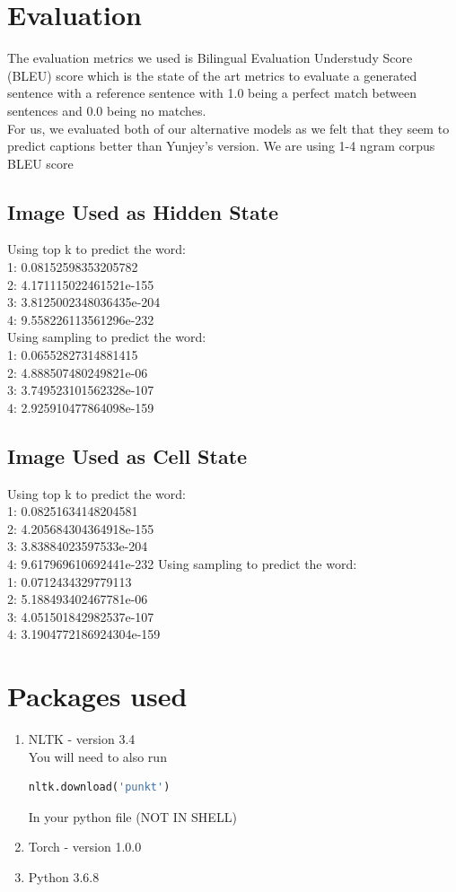 \documentclass{proc}
\begin{document}
\section{Evaluation}
The evaluation metrics we used is Bilingual Evaluation Understudy Score (BLEU) score which is the state of the art metrics to evaluate a generated sentence with a reference sentence with 1.0 being a perfect match between sentences and 0.0 being no matches.\\
For us, we evaluated both of our alternative models as we felt that they seem to predict captions better than Yunjey's version. We are using 1-4 ngram corpus BLEU score\\
\subsection{Image Used as Hidden State}
Using top k to predict the word:\\
1: 0.08152598353205782\\
2: 4.171115022461521e-155\\
3: 3.8125002348036435e-204\\
4: 9.558226113561296e-232\\
Using sampling to predict the word:\\
1: 0.06552827314881415\\
2: 4.888507480249821e-06\\
3: 3.749523101562328e-107\\
4: 2.925910477864098e-159
\subsection{Image Used as Cell State}
Using top k to predict the word:\\
1: 0.08251634148204581\\
2: 4.205684304364918e-155\\
3: 3.83884023597533e-204\\
4: 9.617969610692441e-232
Using sampling to predict the word:\\
1: 0.0712434329779113\\
2: 5.188493402467781e-06\\
3: 4.051501842982537e-107\\
4: 3.1904772186924304e-159

\section{Packages used}
\begin{enumerate}
\item NLTK - version 3.4 \\
You will need to also run 
\begin{lstlisting}[language=python]
nltk.download('punkt')
\end{lstlisting}
In your python file (NOT IN SHELL)
\item Torch - version 1.0.0
\item Python 3.6.8
\end{enumerate}
\end{document}
